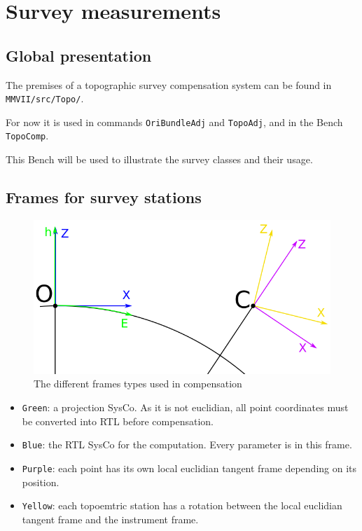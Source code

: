 
\section{Survey measurements}
\label{Chap:TopoProg}
\subsection{Global presentation}

The premises of a topographic survey compensation system can be found in \texttt{MMVII/src/Topo/}.

For now it is used in commands \texttt{OriBundleAdj} and \texttt{TopoAdj}, and in the Bench \texttt{TopoComp}.

This Bench will be used to illustrate the survey classes and their usage.


\subsection{Frames for survey stations}

\begin{figure}[!h]
\centering
\includegraphics[width=12cm]{Programmer/framesTopo.png}
\caption{The different frames types used in compensation}
\label{fig:topoFrames}
\end{figure}


 \begin{itemize}
    \item \texttt{Green}: a projection SysCo. As it is not euclidian, all point coordinates must be converted into RTL before compensation.
    \item \texttt{Blue}: the RTL SysCo for the computation. Every parameter is in this frame.
    \item \texttt{Purple}: each point has its own local euclidian tangent frame depending on its position.
    \item \texttt{Yellow}: each topoemtric station has a rotation between the local euclidian tangent frame and the instrument frame.
 \end{itemize}

